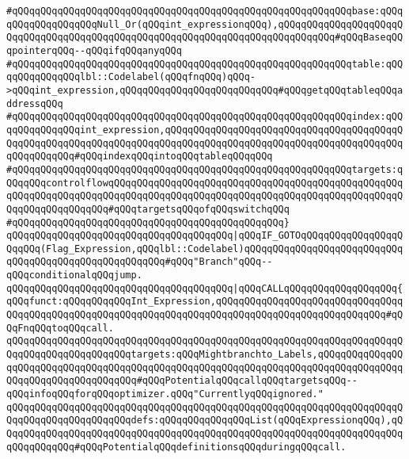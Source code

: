 \verb|#qQQqqQQqqQQqqQQqqQQqqQQqqQQqqQQqqQQqqQQqqQQqqQQqqQQqqQQqqQQqbase:qQQqqQQqqQQqqQQqqQQqNull_Or(qQQqint_expressionqQQq),qQQqqQQqqQQqqQQqqQQqqQQqqQQqqQQqqQQqqQQqqQQqqQQqqQQqqQQqqQQqqQQqqQQqqQQqqQQqqQQq#qQQqBaseqQQqpointerqQQq--qQQqifqQQqanyqQQq|\newline
\verb|#qQQqqQQqqQQqqQQqqQQqqQQqqQQqqQQqqQQqqQQqqQQqqQQqqQQqqQQqqQQqtable:qQQqqQQqqQQqqQQqlbl::Codelabel(qQQqfnqQQq)qQQq->qQQqint_expression,qQQqqQQqqQQqqQQqqQQqqQQqqQQq#qQQqgetqQQqtableqQQqaddressqQQq|\newline
\verb|#qQQqqQQqqQQqqQQqqQQqqQQqqQQqqQQqqQQqqQQqqQQqqQQqqQQqqQQqqQQqindex:qQQqqQQqqQQqqQQqint_expression,qQQqqQQqqQQqqQQqqQQqqQQqqQQqqQQqqQQqqQQqqQQqqQQqqQQqqQQqqQQqqQQqqQQqqQQqqQQqqQQqqQQqqQQqqQQqqQQqqQQqqQQqqQQqqQQqqQQqqQQqqQQq#qQQqindexqQQqintoqQQqtableqQQqqQQq|\newline
\verb|#qQQqqQQqqQQqqQQqqQQqqQQqqQQqqQQqqQQqqQQqqQQqqQQqqQQqqQQqqQQqtargets:qQQqqQQqcontrolflowqQQqqQQqqQQqqQQqqQQqqQQqqQQqqQQqqQQqqQQqqQQqqQQqqQQqqQQqqQQqqQQqqQQqqQQqqQQqqQQqqQQqqQQqqQQqqQQqqQQqqQQqqQQqqQQqqQQqqQQqqQQqqQQqqQQqqQQqqQQq#qQQqtargetsqQQqofqQQqswitchqQQq|\newline
\verb|#qQQqqQQqqQQqqQQqqQQqqQQqqQQqqQQqqQQqqQQqqQQqqQQq}|\newline
\newline
\verb|qQQqqQQqqQQqqQQqqQQqqQQqqQQqqQQqqQQqqQQq|\verb#|qQQqIF_GOTOqQQqqQQqqQQqqQQqqQQqqQQq(Flag_Expression,qQQqlbl::Codelabel)qQQqqQQqqQQqqQQqqQQqqQQqqQQqqQQqqQQqqQQqqQQqqQQqqQQqqQQq#\verb|#qQQq"Branch"qQQq--qQQqconditionalqQQqjump.|\newline
\newline
\verb|qQQqqQQqqQQqqQQqqQQqqQQqqQQqqQQqqQQqqQQq|\verb#|qQQqCALLqQQqqQQqqQQqqQQqqQQq{qQQqfunct:qQQqqQQqqQQqInt_Expression,qQQqqQQqqQQqqQQqqQQqqQQqqQQqqQQqqQQqqQQqqQQqqQQqqQQqqQQqqQQqqQQqqQQqqQQqqQQqqQQqqQQqqQQqqQQqqQQqqQQq#\verb|#qQQqFnqQQqtoqQQqcall.|\newline
\verb|qQQqqQQqqQQqqQQqqQQqqQQqqQQqqQQqqQQqqQQqqQQqqQQqqQQqqQQqqQQqqQQqqQQqqQQqqQQqqQQqqQQqqQQqqQQqtargets:qQQqMightbranchto_Labels,qQQqqQQqqQQqqQQqqQQqqQQqqQQqqQQqqQQqqQQqqQQqqQQqqQQqqQQqqQQqqQQqqQQqqQQqqQQqqQQqqQQqqQQqqQQqqQQqqQQqqQQqqQQq#qQQqPotentialqQQqcallqQQqtargetsqQQq--qQQqinfoqQQqforqQQqoptimizer.qQQq"CurrentlyqQQqignored."|\newline
\verb|qQQqqQQqqQQqqQQqqQQqqQQqqQQqqQQqqQQqqQQqqQQqqQQqqQQqqQQqqQQqqQQqqQQqqQQqqQQqqQQqqQQqqQQqqQQqdefs:qQQqqQQqqQQqqQQqList(qQQqExpressionqQQq),qQQqqQQqqQQqqQQqqQQqqQQqqQQqqQQqqQQqqQQqqQQqqQQqqQQqqQQqqQQqqQQqqQQqqQQqqQQqqQQqqQQq#qQQqPotentialqQQqdefinitionsqQQqduringqQQqcall.|\newline
